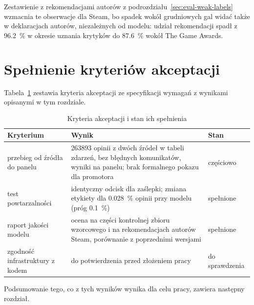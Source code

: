 Zestawienie z rekomendacjami autorów z podrozdziału~\ref{sec:eval-weak-labels} wzmacnia te obserwacje dla Steam, bo spadek wokół grudniowych gal widać także w deklaracjach autorów, niezależnych od modelu: udział rekomendacji spadł z \qty{96.2}{\percent} w okresie uznania krytyków do \qty{87.6}{\percent} wokół The Game Awards.

\section{Spełnienie kryteriów akceptacji}
\label{sec:eval-acceptance}

Tabela~\ref{tab:acceptance} zestawia kryteria akceptacji ze specyfikacji wymagań z wynikami opisanymi w tym rozdziale.

\begin{table}[hbp]
  \caption{Kryteria akceptacji i stan ich spełnienia}
  \label{tab:acceptance}
  \centering
  \small
  \begin{tabular}{|p{}|p{}|p{}|}
    \hline
    Kryterium                          & Wynik                                                                                                                & Stan          \\
    \hline
    przebieg od źródła do panelu       & \num{263893} opinii z dwóch źródeł w tabeli zdarzeń, bez błędnych komunikatów, wyniki na panelu; brak formalnego pokazu dla promotora & częściowo \\
    \hline
    test powtarzalności                & identyczny odcisk dla zaślepki; zmiana etykiety dla \qty{0.028}{\percent} opinii przy modelu (próg \qty{0.1}{\percent})   & spełnione     \\
    \hline
    raport jakości modelu              & ocena na części kontrolnej zbioru wzorcowego i na rekomendacjach autorów Steam, porównanie z poprzednimi wersjami       & spełnione     \\
    \hline
    zgodność infrastruktury z kodem    & do potwierdzenia przed złożeniem pracy                                                                                & do sprawdzenia \\
    \hline
  \end{tabular}
\end{table}

Podsumowanie tego, co z tych wyników wynika dla celu pracy, zawiera następny rozdział.
